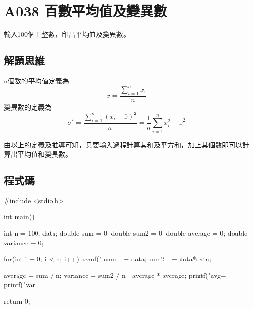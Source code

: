 \section{A038 百數平均值及變異數}
輸入100個正整數，印出平均值及變異數。

\subsection{解題思維}

n個數的平均值定義為
$$\bar{x}=\frac{\sum_{i=1}^nx_{i}}{n}$$
變異數的定義為
$$\sigma^2=\frac{\sum_{i=1}^n(x_{i}-\bar{x})^2}{n}=\frac1n\sum_{i=1}^n x_i^2 - \bar{x}^2$$

由以上的定義及推導可知，只要輸入過程計算其和及平方和，加上其個數即可以計算出平均值和變異數。

\subsection{程式碼}
\begin{cppcode}
	#include <stdio.h>
	
	int main()
	{
		int n = 100, data;
		double sum = 0;
		double sum2 = 0;
		double average = 0;
		double variance = 0;
		
		for(int i = 0; i < n; i++) {
			scanf("%
			sum += data;
			sum2 += data*data;
		}
		
		average = sum / n;
		variance = sum2 / n - average * average;
		printf("avg=%
		printf("var=%
		
		return 0;
	}
\end{cppcode}
